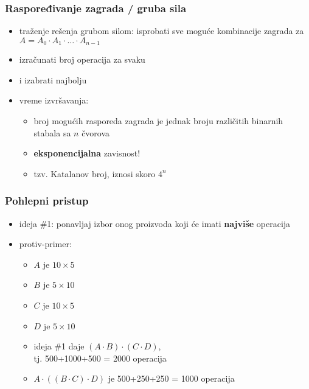 \documentclass[compress,aspectratio=169]{beamer}
\begin{document}
\begin{frame}[fragile]
  \frametitle{Raspoređivanje zagrada / gruba sila}
  \begin{itemize}
    \item traženje rešenja grubom silom: isprobati sve moguće 
    kombinacije zagrada za $A=A_0 \cdot A_{1}\cdot \ldots\cdot A_{n-1}$ 
    \item izračunati broj operacija za svaku
    \item i izabrati najbolju
    \item vreme izvršavanja:
    \begin{itemize}
      \item broj mogućih rasporeda zagrada je jednak broju različitih 
      binarnih stabala sa $n$ čvorova
      \item \textbf{eksponencijalna} zavisnost!
      \item tzv. Katalanov broj, iznosi skoro $4^n$
    \end{itemize}
  \end{itemize}
\end{frame}

\begin{frame}[fragile]
  \frametitle{Pohlepni pristup}
  \begin{itemize}
    \item ideja \#1: ponavljaj izbor onog proizvoda koji će imati \textbf{najviše} operacija
    \item protiv-primer:
    \begin{itemize}
      \item $A$ je $10\times 5$
      \item $B$ je $5\times 10$
      \item $C$ je $10\times 5$
      \item $D$ je $5\times 10$
      \item ideja \#1 daje $(A\cdot B)\cdot (C\cdot D)$, \\ tj. 500+1000+500 = 2000 operacija
      \item $A\cdot ((B\cdot C)\cdot D)$ je 500+250+250 = 1000 operacija
    \end{itemize}
  \end{itemize}
\end{frame}
\end{document}

